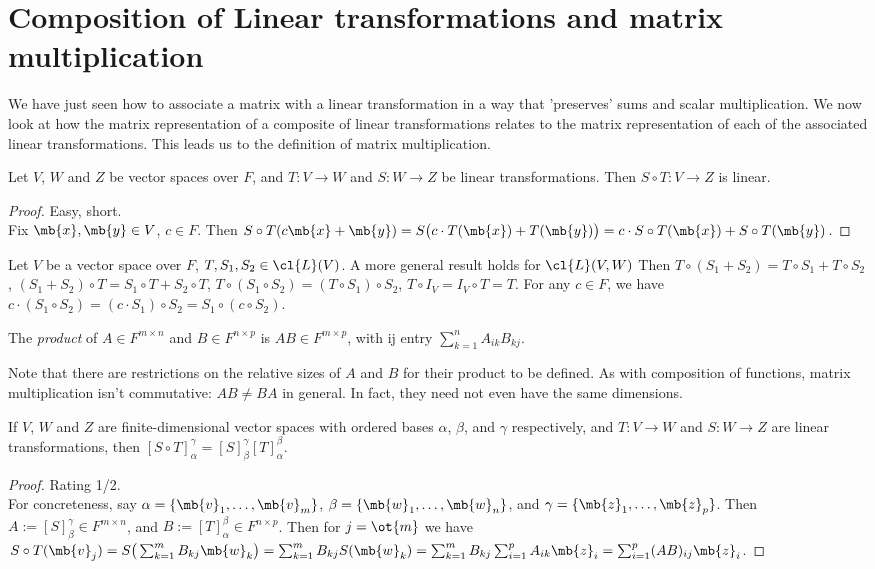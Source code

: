 \section{Composition of Linear transformations and matrix multiplication}
We have just seen how to associate a matrix with a linear transformation in a way that 'preserves' sums and scalar multiplication.
We now look at how the matrix representation of a composite of linear transformations relates to the matrix representation of each of the associated linear transformations. This leads us to the definition of matrix multiplication.
\begin{lem}
Let $V$, $W$ and $Z$ be vector spaces over $F$, and $T:V \to W$ and $S:W \to Z$ be linear transformations. Then $S \circ T:V \to Z$ is linear. 
\end{lem}
\begin{proof}
Easy, short.\\
Fix $\mb{x}, \mb{y}\in V$, $c \in F$. Then $S \circ T(c \mb{x}+ \mb{y})=S \big( c \cdot T( \mb{x})+T( \mb{y}) \big)=c \cdot S \circ T( \mb{x})+S \circ T( \mb{y})$.
\end{proof}
\begin{exer}\label{e:compose-lin}
Let $V$ be a vector space over $F$, $T,S_1,S_2 \in \cl{L}(V)$. {\color{red} A more general result holds for $\cl{L}(V,W)$} Then $T \circ (S_1+S_2)=T \circ S_1+T \circ S_2$, $(S_1+S_2) \circ T=S_1 \circ T+S_2 \circ T$, $T \circ (S_1 \circ S_2)=(T \circ S_1) \circ S_2$, $T \circ I_V=I_V \circ T=T$.
For any $c \in F$, we have $c \cdot (S_1 \circ S_2)=(c \cdot S_1) \circ S_2=S_1 \circ (c \circ S_2)$.
\end{exer}
\begin{defn}
The \emph{product} of $A \in F^{m \times n}$ and $B \in F^{n \times p}$ is $AB \in F^{m \times p}$, with ij entry $\sum_{k=1}^nA_{ik}B_{kj}$.
\end{defn}
Note that there are restrictions on the relative sizes of $A$ and $B$ for their product to be defined. As with composition of functions, matrix multiplication isn't commutative: $AB \neq BA$ in general. In fact, they need not even have the same dimensions.
\begin{lem}\label{l:matrix-compose}
If $V$, $W$ and $Z$ are finite-dimensional vector spaces with ordered bases $\alpha$, $\beta$, and $\gamma$ respectively, and $T:V \to W$ and $S:W \to Z$ are linear transformations, then $[S \circ T]_\alpha^\gamma =[S]_\beta^\gamma [T]_\alpha^\beta$.
\end{lem}
\begin{proof}
Rating 1/2.\\
For concreteness, say $\alpha= \{ \mb{v}_1, \ldots, \mb{v}_m \}$, $\beta= \{ \mb{w}_1, \ldots, \mb{w}_n \}$, and $\gamma= \{ \mb{z}_1, \ldots, \mb{z}_p \}$. Then $A:=[S]_\beta^\gamma \in F^{m \times n}$, and $B:=[T]_\alpha^\beta \in F^{n \times p}$.
Then for $j= \ot{m}$ we have $S \circ T( \mb{v}_j)=S \big( \sum_{k=1}^mB_{kj}\mb{w}_k \big) = \sum_{k=1}^mB_{kj}S( \mb{w}_k)= \sum_{k=1}^mB_{kj}\sum_{i=1}^pA_{ik}\mb{z}_i= \sum_{i=1}^p(AB)_{ij}\mb{z}_i$.
\end{proof}
